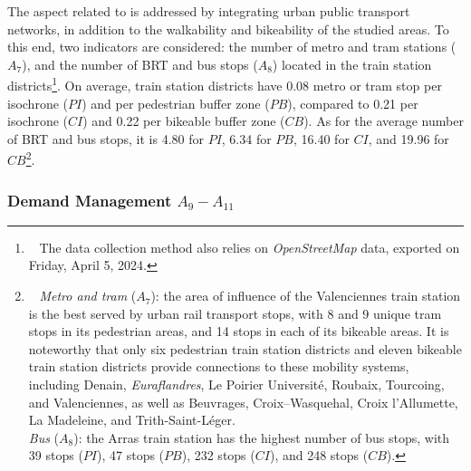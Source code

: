 \begin{refsegment}
The aspect related to  is addressed by integrating urban public transport networks, in addition to the \gls{walkability} and bikeability of the studied areas. To this end, two indicators are considered: the number of metro and tram stations (\(A_{7}\)), and the number of \acrshort{BRT} and bus stops (\(A_{8}\)) located in the train station districts\footnote{~
    The data collection method also relies on \textsl{OpenStreetMap} data, exported on Friday, April 5, 2024.
}. On average, train station districts have 0.08 metro or tram stop per isochrone (\(PI\)) and per pedestrian buffer zone (\(PB\)), compared to 0.21 per isochrone (\(CI\)) and 0.22 per bikeable buffer zone (\(CB\)). As for the average number of \acrshort{BRT} and bus stops, it is 4.80 for \(PI\), 6.34 for \(PB\), 16.40 for \(CI\), and 19.96 for \(CB\)\footnote{~
    \textsl{Metro and tram} (\(A_{7}\)): the area of influence of the Valenciennes train station is the best served by urban rail transport stops, with 8 and 9 unique tram stops in its pedestrian areas, and 14 stops in each of its bikeable areas. It is noteworthy that only six pedestrian train station districts and eleven bikeable train station districts provide connections to these mobility systems, including Denain, \textsl{Euraflandres}, Le Poirier Université, Roubaix, Tourcoing, and Valenciennes, as well as Beuvrages, Croix–Wasquehal, Croix l'Allumette, La Madeleine, and Trith-Saint-Léger.
    \\
    \textsl{Bus} (\(A_{8}\)): the Arras train station has the highest number of bus stops, with 39 stops (\(PI\)), 47 stops (\(PB\)), 232 stops (\(CI\)), and 248 stops (\(CB\)).
}.

\subsubsection*{Demand Management \(A_{9} - A_{11}\)
    \label{chap6:indicateurs-accessibility-management-demande}
    }


\end{refsegment}
